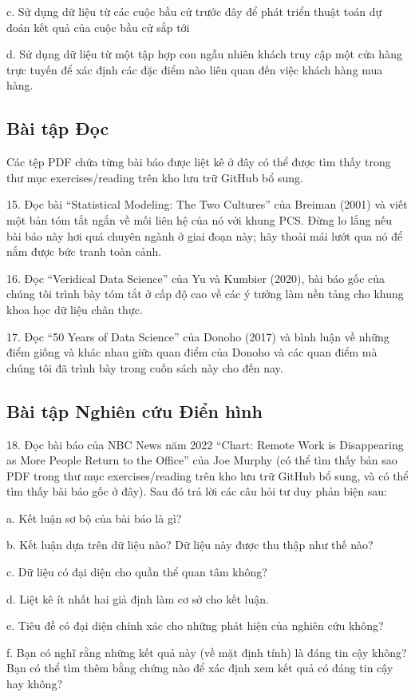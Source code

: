 c. Sử dụng dữ liệu từ các cuộc bầu cử trước đây để phát triển thuật toán dự đoán kết quả của cuộc bầu cử sắp tới

d. Sử dụng dữ liệu từ một tập hợp con ngẫu nhiên khách truy cập một cửa hàng trực tuyến để xác định các đặc điểm nào liên quan đến việc khách hàng mua hàng.

\subsection*{Bài tập Đọc}
Các tệp PDF chứa từng bài báo được liệt kê ở đây có thể được tìm thấy trong thư mục exercises/reading trên kho lưu trữ GitHub bổ sung.

15. Đọc bài “Statistical Modeling: The Two Cultures” của Breiman (2001) và viết một bản tóm tắt ngắn về mối liên hệ của nó với khung PCS. Đừng lo lắng nếu bài báo này hơi quá chuyên ngành ở giai đoạn này; hãy thoải mái lướt qua nó để nắm được bức tranh toàn cảnh.

16. Đọc “Veridical Data Science” của Yu và Kumbier (2020), bài báo gốc của chúng tôi trình bày tóm tắt ở cấp độ cao về các ý tưởng làm nền tảng cho khung khoa học dữ liệu chân thực.

17. Đọc “50 Years of Data Science” của Donoho (2017) và bình luận về những điểm giống và khác nhau giữa quan điểm của Donoho và các quan điểm mà chúng tôi đã trình bày trong cuốn sách này cho đến nay.

\subsection*{Bài tập Nghiên cứu Điển hình}
18. Đọc bài báo của NBC News năm 2022 “Chart: Remote Work is Disappearing as More People Return to the Office” của Joe Murphy (có thể tìm thấy bản sao PDF trong thư mục exercises/reading trên kho lưu trữ GitHub bổ sung, và có thể tìm thấy bài báo gốc ở đây). Sau đó trả lời các câu hỏi tư duy phản biện sau:

a. Kết luận sơ bộ của bài báo là gì?

b. Kết luận dựa trên dữ liệu nào? Dữ liệu này được thu thập như thế nào?

c. Dữ liệu có đại diện cho quần thể quan tâm không?

d. Liệt kê ít nhất hai giả định làm cơ sở cho kết luận.

e. Tiêu đề có đại diện chính xác cho những phát hiện của nghiên cứu không?

f. Bạn có nghĩ rằng những kết quả này (về mặt định tính) là đáng tin cậy không? Bạn có thể tìm thêm bằng chứng nào để xác định xem kết quả có đáng tin cậy hay không?

